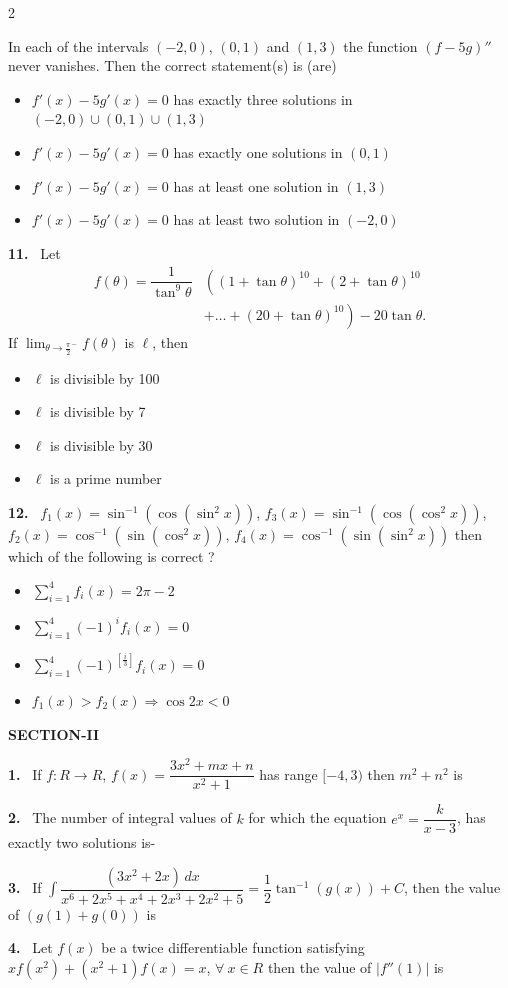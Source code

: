 \documentclass[10pt]{extarticle}
\newcommand{\sect}[1]{\par\smallskip\noindent\textbf{#1}\par}
\newcommand{\qn}[1]{\par\smallskip\noindent\textbf{#1.}~}
\newenvironment{qoptions}{\begin{itemize}[leftmargin=1.8em,itemsep=1pt,topsep=2pt,label={}]}{\end{itemize}}
\newcommand{\opt}[2]{\item[(#1)] #2}
\begin{document}
\begin{multicols}{2}
\smallskip
{}\par
\smallskip
In each of the intervals $(-2,0)$, $(0,1)$ and $(1,3)$ the function $(f-5g)''$ never vanishes. Then the correct statement(s) is (are)
\begin{qoptions}
\opt{A}{$f'(x)-5g'(x)=0$ has exactly three solutions in $(-2,0)\cup(0,1)\cup(1,3)$}
\opt{B}{$f'(x)-5g'(x)=0$ has exactly one solutions in $(0,1)$}
\opt{C}{$f'(x)-5g'(x)=0$ has at least one solution in $(1,3)$}
\opt{D}{$f'(x)-5g'(x)=0$ has at least two solution in $(-2,0)$}
\end{qoptions}
\qn{11} Let
\[\begin{aligned}f(\theta)=\dfrac{1}{\tan^9\theta}&\left((1+\tan\theta)^{10}+(2+\tan\theta)^{10}\right.\\&\left.+\ldots+(20+\tan\theta)^{10}\right)-20\tan\theta.\end{aligned}\]
If $\displaystyle\lim_{\theta\to\frac\pi2^-}f(\theta)$ is $\ell$, then
\begin{qoptions}
\opt{A}{$\ell$ is divisible by 100}
\opt{B}{$\ell$ is divisible by 7}
\opt{C}{$\ell$ is divisible by 30}
\opt{D}{$\ell$ is a prime number}
\end{qoptions}
\qn{12} $f_1(x)=\sin^{-1}(\cos(\sin^2x))$, $f_3(x)=\sin^{-1}(\cos(\cos^2x))$, $f_2(x)=\cos^{-1}(\sin(\cos^2x))$, $f_4(x)=\cos^{-1}(\sin(\sin^2x))$ then which of the following is correct ?
\begin{qoptions}
\opt{A}{$\displaystyle\sum_{i=1}^{4}f_i(x)=2\pi-2$}
\opt{B}{$\displaystyle\sum_{i=1}^{4}(-1)^if_i(x)=0$}
\opt{C}{$\displaystyle\sum_{i=1}^{4}(-1)^{\left[\frac i3\right]}f_i(x)=0$}
\opt{D}{$f_1(x)>f_2(x)\Rightarrow\cos2x<0$}
\end{qoptions}
\sect{SECTION-II}
\qn{1} If $f:R\to R$, $f(x)=\dfrac{3x^2+mx+n}{x^2+1}$ has range $[-4,3)$ then $m^2+n^2$ is
\qn{2} The number of integral values of $k$ for which the equation $e^x=\dfrac{k}{x-3}$, has exactly two solutions is-
\qn{3} If $\displaystyle\int\dfrac{(3x^2+2x)\,dx}{x^6+2x^5+x^4+2x^3+2x^2+5}=\dfrac12\tan^{-1}(g(x))+C$, then the value of $(g(1)+g(0))$ is
\qn{4} Let $f(x)$ be a twice differentiable function satisfying $xf(x^2)+(x^2+1)f(x)=x$, $\forall\ x\in R$ then the value of $|f''(1)|$ is

\end{multicols}
\end{document}
